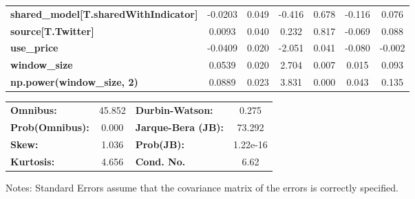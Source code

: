 \begin{center}
\begin{tabular}{lcccccc}
\textbf{shared\_model[T.sharedWithIndicator]} &      -0.0203  &        0.049     &    -0.416  &         0.678        &       -0.116    &        0.076     \\
\textbf{source[T.Twitter]}                    &       0.0093  &        0.040     &     0.232  &         0.817        &       -0.069    &        0.088     \\
\textbf{use\_price}                           &      -0.0409  &        0.020     &    -2.051  &         0.041        &       -0.080    &       -0.002     \\
\textbf{window\_size}                         &       0.0539  &        0.020     &     2.704  &         0.007        &        0.015    &        0.093     \\
\textbf{np.power(window\_size, 2)}            &       0.0889  &        0.023     &     3.831  &         0.000        &        0.043    &        0.135     \\
\bottomrule
\end{tabular}
\begin{tabular}{lclc}
\textbf{Omnibus:}       & 45.852 & \textbf{  Durbin-Watson:     } &    0.275  \\
\textbf{Prob(Omnibus):} &  0.000 & \textbf{  Jarque-Bera (JB):  } &   73.292  \\
\textbf{Skew:}          &  1.036 & \textbf{  Prob(JB):          } & 1.22e-16  \\
\textbf{Kurtosis:}      &  4.656 & \textbf{  Cond. No.          } &     6.62  \\
\bottomrule
\end{tabular}
\end{center}

Notes: \newline
 [1] Standard Errors assume that the covariance matrix of the errors is correctly specified.